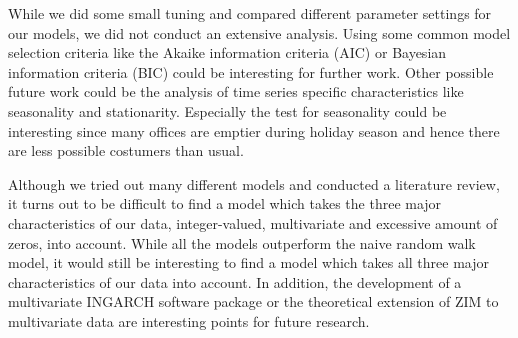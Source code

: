 While we did some small tuning and compared different parameter settings for our models, we did not conduct an extensive analysis. Using some common model selection criteria like the Akaike information criteria (AIC) or Bayesian information criteria (BIC) could be interesting for further work. Other possible future work could be the analysis of time series specific characteristics like seasonality and stationarity. Especially the test for seasonality could be interesting since many offices are emptier during holiday season and hence there are less possible costumers than usual. 

Although we tried out many different models and conducted a literature review, it turns out to be difficult to find a model which takes the three major characteristics of our data, integer-valued, multivariate and excessive amount of zeros, into account. While all the models outperform the naive random walk model, it would still be interesting to find a model which takes all three major characteristics of our data into account. In addition, the development of a multivariate INGARCH software package or the theoretical extension of ZIM to multivariate data are interesting points for future research. 